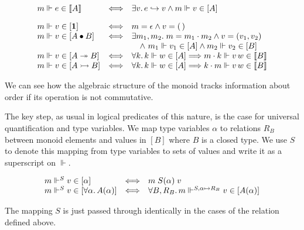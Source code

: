 \par  \quad  \[\begin{array}[]{lcl}m\Vdash e\in\llbracket A\rrbracket&\Longleftrightarrow&\exists v.\,e\mathrel{\hookrightarrow}v\land m\Vdash v\in[A]\\[10.00002pt]
m\Vdash v\in[\mathbf{1}]&\Longleftrightarrow&m=\epsilon\land v=(\,)\\
m\Vdash v\in[A\bullet B]&\Longleftrightarrow&\hskip-5.0pt\begin{array}[t]{l}\exists m_{1},m_{2}.\;m=m_{1}\cdot m_{2}\land v=(v_{1},v_{2})\\
\quad\land\nobreak\ m_{1}\Vdash v_{1}\in[A]\land m_{2}\Vdash v_{2}\in[B]\end{array}\\
m\Vdash v\in[A\twoheadrightarrow B]&\Longleftrightarrow&\forall k.\,k\Vdash w\in[A]\Longrightarrow m\cdot k\Vdash v\,w\in\llbracket B\rrbracket\\
m\Vdash v\in[A\rightarrowtail B]&\Longleftrightarrow&\forall k.\,k\Vdash w\in[A]\Longrightarrow k\cdot m\Vdash v\,w\in\llbracket B\rrbracket\end{array}\]\quad  \quad  
  
We can see how the algebraic structure of the monoid tracks information about order if its operation is not commutative.\par
 
 
 
The key step, as usual in logical predicates of this nature, is the case for universal quantification and type variables. We map type variables $\alpha$ to relations $R_{B}$ between monoid elements and values in $[B]$ where $B$ is a closed type. We use $S$ to denote this mapping from type variables to sets of values and write it as a superscript on $\Vdash$.\par
  
\par  \quad  \[\begin{array}[]{lcl}m\Vdash^{S}v\in[\alpha]&\Longleftrightarrow&m\mathrel{S(\alpha)}v\\
m\Vdash^{S}v\in[\forall\alpha.\,A(\alpha)]&\Longleftrightarrow&\forall B,R_{B}.\,m\Vdash^{S,\alpha\mapsto R_{B}}v\in[A(\alpha)]\end{array}\]\quad  \quad  
  
The mapping $S$ is just passed through identically in the cases of the relation defined above.\par
 
